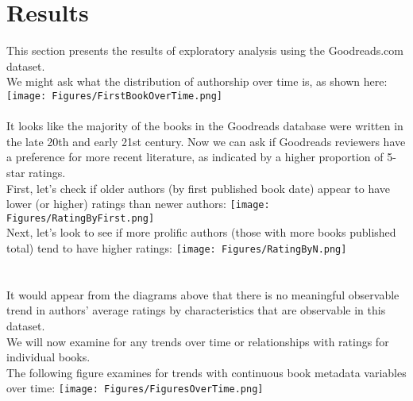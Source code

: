 \documentclass{article}
\begin{document}
\section{Results}
This section presents the results of exploratory analysis using the Goodreads.com dataset.
\\
We might ask what the distribution of authorship over time is, as shown here:
\\
\texttt{[image: Figures/FirstBookOverTime.png]}\\
\\It looks like the majority of the books in the Goodreads database were written in the late 20th and early 21st century.
Now we can ask if Goodreads reviewers have a preference for more recent literature, as indicated by a higher proportion of 5-star ratings.
\\First, let's check if older authors (by first published book date) appear to have lower (or higher) ratings than newer authors:
\texttt{[image: Figures/RatingByFirst.png]}\\
Next, let's look to see if more prolific authors (those with more books published total) tend to have higher ratings:
\texttt{[image: Figures/RatingByN.png]}\\
\\
\\It would appear from the diagrams above that there is no meaningful observable trend in authors' average ratings by characteristics that are observable in this dataset.
\\ We will now examine for any trends over time or relationships with ratings for individual books.
\\ The following figure examines for trends with continuous book metadata variables over time:
\texttt{[image: Figures/FiguresOverTime.png]}
\end{document}
